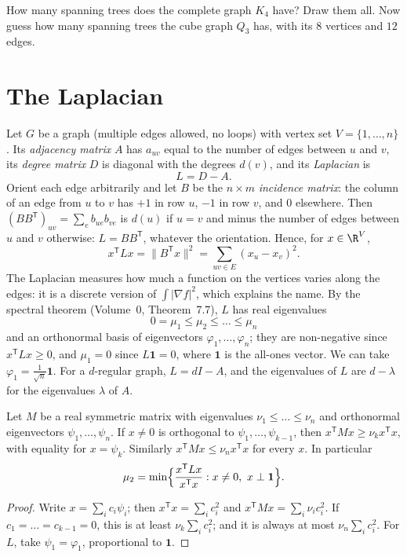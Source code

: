 \begin{think}
How many spanning trees does the complete graph $K_4$ have? Draw them all. Now guess how many spanning trees the cube graph
$Q_3$ has, with its $8$ vertices and $12$ edges.
\end{think}

\section{The Laplacian}

Let $G$ be a graph (multiple edges allowed, no loops) with vertex set $V=\{1,\dots,n\}$. Its \emph{adjacency matrix} $A$ has $a_{uv}$ equal to the
number of edges between $u$ and $v$, its \emph{degree matrix} $D$ is diagonal with the degrees $d(v)$, and its \emph{Laplacian} is
\[
L=D-A.
\]
Orient each edge arbitrarily and let $B$ be the $n\times m$ \emph{incidence matrix}: the column of an edge from $u$ to $v$ has $+1$ in row $u$, $-1$ in
row $v$, and $0$ elsewhere. Then $(BB^{\mathsf T})_{uv}=\sum_eb_{ue}b_{ve}$ is $d(u)$ if $u=v$ and minus the number of edges between $u$ and $v$ otherwise:
$L=BB^{\mathsf T}$, whatever the orientation. Hence, for $x\in\R^V$,
\[
x^{\mathsf T}Lx=\|B^{\mathsf T}x\|^2=\sum_{uv\in E}(x_u-x_v)^2.
\]
The Laplacian measures how much a function on the vertices varies along the edges: it is a discrete version of $\int|\nabla f|^2$, which
explains the name. By the spectral theorem (Volume~0, Theorem~7.7), $L$ has real eigenvalues
\[
0=\mu_1\le\mu_2\le\dots\le\mu_n
\]
and an orthonormal basis of eigenvectors $\varphi_1,\dots,\varphi_n$; they are non-negative since $x^{\mathsf T}Lx\ge0$, and $\mu_1=0$ since $L\mathbf1=0$, where $\mathbf1$ is the all-ones
vector. We can take $\varphi_1=\frac1{\sqrt n}\mathbf1$. For a $d$-regular graph, $L=dI-A$, and the eigenvalues of $L$ are $d-\lambda$ for the eigenvalues $\lambda$ of $A$.

\begin{lemma}[Rayleigh]\label{spectral:lem:rayleigh}
Let $M$ be a real symmetric matrix with eigenvalues $\nu_1\le\dots\le\nu_n$ and orthonormal eigenvectors $\psi_1,\dots,\psi_n$. If $x\ne0$ is orthogonal to
$\psi_1,\dots,\psi_{k-1}$, then $x^{\mathsf T}Mx\ge\nu_kx^{\mathsf T}x$, with equality for $x=\psi_k$. Similarly $x^{\mathsf T}Mx\le\nu_nx^{\mathsf T}x$ for every $x$. In particular
\[
\mu_2=\min\Bigl\{\frac{x^{\mathsf T}Lx}{x^{\mathsf T}x}:x\ne0,\ x\perp\mathbf1\Bigr\}.
\]
\end{lemma}
\begin{proof}
Write $x=\sum_ic_i\psi_i$; then $x^{\mathsf T}x=\sum_ic_i^2$ and $x^{\mathsf T}Mx=\sum_i\nu_ic_i^2$. If $c_1=\dots=c_{k-1}=0$, this is at least $\nu_k\sum_ic_i^2$; and it is always at most
$\nu_n\sum_ic_i^2$. For $L$, take $\psi_1=\varphi_1$, proportional to $\mathbf1$.
\end{proof}

